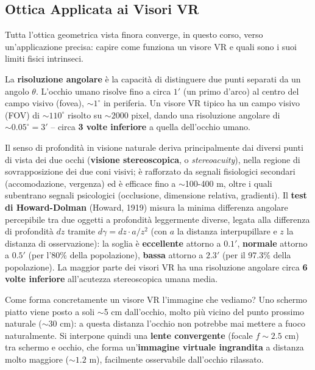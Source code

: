 \documentclass[a4paper,11pt]{article}
\begin{document}
\subsection{Ottica Applicata ai Visori VR}

Tutta l'ottica geometrica vista finora converge, in questo corso, verso un'applicazione precisa: capire come funziona un visore VR e quali sono i suoi limiti fisici intrinseci.

La \textbf{risoluzione angolare} è la capacità di distinguere due punti separati da un angolo $\theta$. L'occhio umano risolve fino a circa $1'$ (un primo d'arco) al centro del campo visivo (fovea), $\sim1^{\circ}$ in periferia. Un visore VR tipico ha un campo visivo (FOV) di $\sim110^{\circ}$ risolto su $\sim2000$ pixel, dando una risoluzione angolare di $\sim0.05^{\circ}=3'$ -- circa \textbf{3 volte inferiore} a quella dell'occhio umano.

Il senso di profondità in visione naturale deriva principalmente dai diversi punti di vista dei due occhi (\textbf{visione stereoscopica}, o \emph{stereoacuity}), nella regione di sovrapposizione dei due coni visivi; è rafforzato da segnali fisiologici secondari (accomodazione, vergenza) ed è efficace fino a $\sim$100-400 m, oltre i quali subentrano segnali psicologici (occlusione, dimensione relativa, gradienti). Il \textbf{test di Howard-Dolman} (Howard, 1919) misura la minima differenza angolare percepibile tra due oggetti a profondità leggermente diverse, legata alla differenza di profondità $dz$ tramite $d\gamma=dz\cdot a/z^2$ (con $a$ la distanza interpupillare e $z$ la distanza di osservazione): la soglia è \textbf{eccellente} attorno a $0.1'$, \textbf{normale} attorno a $0.5'$ (per l'80\% della popolazione), \textbf{bassa} attorno a $2.3'$ (per il 97.3\% della popolazione). La maggior parte dei visori VR ha una risoluzione angolare circa \textbf{6 volte inferiore} all'acutezza stereoscopica umana media.

Come forma concretamente un visore VR l'immagine che vediamo? Uno schermo piatto viene posto a soli $\sim$5 cm dall'occhio, molto più vicino del punto prossimo naturale ($\sim$30 cm): a questa distanza l'occhio non potrebbe mai mettere a fuoco naturalmente. Si interpone quindi una \textbf{lente convergente} (focale $f\sim2.5$ cm) tra schermo e occhio, che forma un'\textbf{immagine virtuale ingrandita} a distanza molto maggiore ($\sim1.2$ m), facilmente osservabile dall'occhio rilassato.
\end{document}

